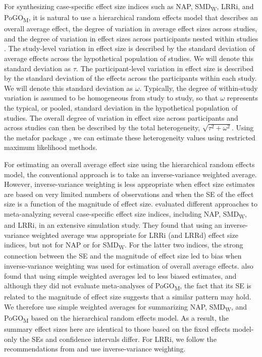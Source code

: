 \documentclass[
]{book}
\begin{document}
For synthesizing case-specific effect size indices such as NAP, SMD\textsubscript{W}, LRRi, and PoGO\textsubscript{M}, it is natural to use a hierarchical random effects model that describes an overall average effect, the degree of variation in average effect sizes across studies, and the degree of variation in effect sizes across participants nested within studies \citep{VandenNoortgate2008multilevel, Moeyaert_Ferron_Beretvas_VandenNoortgate_2014}. The study-level variation in effect size is described by the standard deviation of average effects across the hypothetical population of studies. We will denote this standard deviation as \(\tau\). The participant-level variation in effect size is described by the standard deviation of the effects across the participants within each study. We will denote this standard deviation as \(\omega\). Typically, the degree of within-study variation is assumed to be homogeneous from study to study, so that \(\omega\) represents the typical, or pooled, standard deviation in the hypothetical population of studies. The overall degree of variation in effect size across participants and across studies can then be described by the total heterogeneity, \(\sqrt{\tau^2 + \omega^2}\). Using the metafor package \citep{viechtbauer2010conducting}, we can estimate these heterogeneity values using restricted maximum likelihood methods.

For estimating an overall average effect size using the hierarchical random effects model, the conventional approach is to take an inverse-variance weighted average. However, inverse-variance weighting is less appropriate when effect size estimates are based on very limited numbers of observations and when the SE of the effect size is a function of the magnitude of effect size. \citet{Chen_Pustejovsky_2022} evaluated different approaches to meta-analyzing several case-specific effect size indices, including NAP, SMD\textsubscript{W}, and LRRi, in an extensive simulation study. They found that using an inverse-variance weighted average was appropriate for LRRi (and LRRd) effect size indices, but not for NAP or for SMD\textsubscript{W}. For the latter two indices, the strong connection between the SE and the magnitude of effect size led to bias when inverse-variance weighting was used for estimation of overall average effects. \citet{Chen_Pustejovsky_2022} also found that using simple weighted averages led to less biased estimates, and although they did not evaluate meta-analyses of PoGO\textsubscript{M}, the fact that its SE is related to the magnitude of effect size suggests that a similar pattern may hold. We therefore use simple weighted averages for summarizing NAP, SMD\textsubscript{W}, and PoGO\textsubscript{M} based on the hierarchical random effects model. As a result, the summary effect sizes here are identical to those based on the fixed effects model-only the SEs and confidence intervals differ. For LRRi, we follow the recommendations from \citet{Chen_Pustejovsky_2022} and use inverse-variance weighting.
\end{document}
